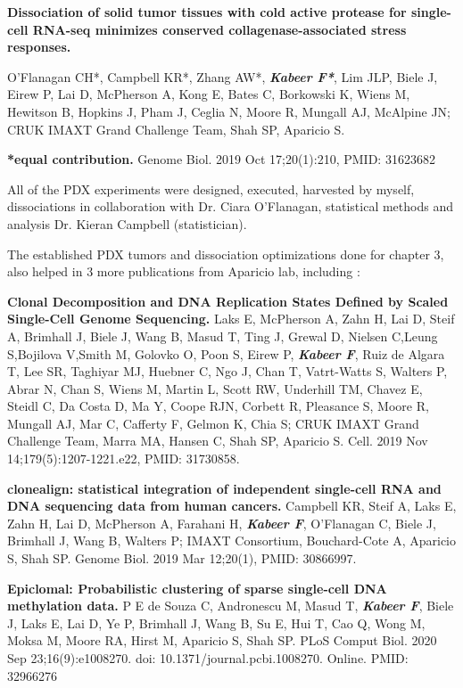 \textbf{Dissociation of solid tumor tissues with cold active protease for single-cell RNA-seq minimizes conserved collagenase-associated stress responses.}

O'Flanagan CH*, Campbell KR*, Zhang AW*, \emph{\textbf{Kabeer F*}}, Lim JLP, Biele J, Eirew P, Lai D, McPherson A, Kong E,
Bates C, Borkowski K, Wiens M, Hewitson B, Hopkins J, Pham J, 
Ceglia N, Moore R, Mungall AJ,
McAlpine JN; CRUK IMAXT Grand Challenge Team, Shah SP, Aparicio S.

\textbf{*equal contribution.} Genome Biol. 2019 Oct 17;20(1):210, PMID: 31623682 

All of the PDX experiments were designed, executed, harvested by myself, dissociations in collaboration with Dr. Ciara O'Flanagan, statistical methods and analysis Dr. Kieran Campbell (statistician).

The established PDX tumors and dissociation optimizations done for chapter 3, also helped in 3 more publications from Aparicio lab, including \cite{laks2019clonal, campbell2019clonealign, de2020epiclomal}:
     
\textbf{Clonal Decomposition and DNA Replication States Defined by Scaled Single-Cell Genome Sequencing.}
Laks E, McPherson A, Zahn H, Lai D, Steif A, Brimhall J, Biele J, Wang B, Masud T, Ting J, Grewal D, Nielsen C,Leung S,Bojilova V,Smith M, Golovko O, Poon S, Eirew P, \emph{\textbf{Kabeer F}}, Ruiz de Algara T, Lee SR, Taghiyar MJ, Huebner C, Ngo J, Chan T, Vatrt-Watts S, Walters P, Abrar N, Chan S, Wiens M, Martin L, Scott RW, Underhill TM, Chavez E, Steidl C, Da Costa D, Ma Y, Coope RJN, Corbett R, Pleasance S, Moore R, Mungall AJ, Mar C, Cafferty F, Gelmon K, Chia S; CRUK IMAXT Grand Challenge Team, Marra MA, Hansen C, Shah SP, Aparicio S. Cell. 2019 Nov 14;179(5):1207-1221.e22,  PMID: 31730858.


\textbf{clonealign: statistical integration of independent single-cell RNA and DNA sequencing data from human cancers.}
Campbell KR, Steif A, Laks E, Zahn H, Lai D, McPherson A, Farahani H, \emph{\textbf{Kabeer F}}, O'Flanagan  C, Biele J, Brimhall J, Wang B, Walters P; IMAXT Consortium, Bouchard-Cote A, Aparicio S, Shah SP. Genome Biol. 2019 Mar 12;20(1), PMID: 30866997. 

\textbf{Epiclomal: Probabilistic clustering of sparse single-cell DNA methylation data.}
P E de Souza C, Andronescu M, Masud T, \emph{\textbf{Kabeer F}}, Biele J, Laks E, Lai D, Ye P, Brimhall J, Wang B, Su E, Hui T, Cao Q, Wong M, Moksa M, Moore RA, Hirst M, Aparicio S, Shah SP. PLoS Comput Biol. 2020 Sep 23;16(9):e1008270. doi: 10.1371/journal.pcbi.1008270. Online. PMID: 32966276

